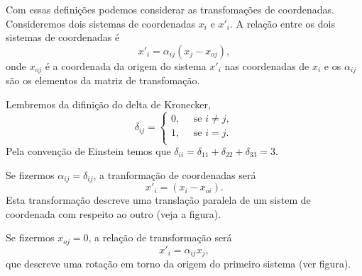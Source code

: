 Com essas defini\c{c}\~oes podemos considerar as
transfoma\c{c}\~oes de coordenadas. Consideremos dois sistemas de
 coordenadas $x_{i}$ e $x'_{i}$. A rela\c{c}\~ao entre os dois sistemas de coordenadas \'e
\[x'_{i}=\alpha_{ij}(x_{j}-x_{oj}),\]
onde $x_{oj}$ \'e a coordenada da origem do sistema $x'_{i}$ nas coordenadas de
$x_{i}$ e os $\alpha_{ij}$ s\~ao os elementos da matriz de
transfoma\c{c}\~ao.

Lembremos da difini\c{c}\~ao do delta de Kronecker,
\[\delta_{ij}=\left \{ \begin{array}{l}
                0, \mbox{   }\mbox{   }\mbox{se } i \neq j,\\
                1, \mbox{   }\mbox{   }\mbox{se } i= j.\\
\end{array} \right.\]
Pela conven\c{c}\~ao de Einstein temos que
$\delta_{ii}=\delta_{11}+\delta_{22}+\delta_{33}=3$.

Se fizermos $\alpha_{ij}=\delta_{ij}$, a tranforma\c{c}\~ao de
coordenadas ser\'a
\[x'_{i}=(x_{i}-x_{oi}).\]
Esta transforma\c{c}\~ao descreve uma transla\c{c}\~ao paralela de um sistem de coordenada
com respeito ao outro (veja a figura). 


Se fizermos  $x_{oj}=0$, a rela\c{c}\~ao de
transforma\c{c}\~ao ser\'a
\[x'_{i}=\alpha_{ij}x_{j},\]
que descreve uma rota\c{c}\~ao em torno da origem do primeiro
sistema (ver figura).


